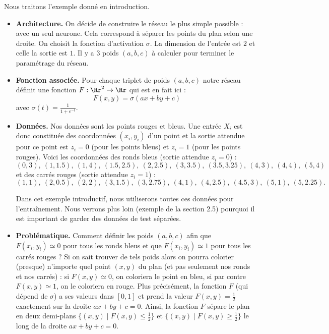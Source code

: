 \begin{exemple}{}{}
	Nous traitons l'exemple donné en introduction.
	\begin{itemize}
		\item \textbf{Architecture.} On décide de construire le réseau le plus simple possible : avec un seul neurone. Cela correspond à séparer les points du plan selon une droite.
		On choisit la fonction d'activation $\sigma$.
		La dimension de l'entrée est $2$ et celle la sortie est $1$.
		Il y a $3$ poids $(a,b,c)$ à calculer pour terminer le paramétrage du réseau.
		
		
		\item \textbf{Fonction associée.} Pour chaque triplet de poids $(a,b,c)$ notre réseau définit une fonction $F : \Rr^2 \to \Rr$
		qui est en fait ici :
		$$F(x,y) = \sigma(ax+by+c)$$
		avec $\sigma(t) = \frac{1}{1+e^{-t}}$.
		
		
		
		\item \textbf{Données.} Nos données sont les points rouges et bleus.
		Une entrée $X_i$ est donc constituée des coordonnées $(x_i,y_i)$ d'un point et la sortie attendue pour ce point est $z_i = 0$ (pour les points bleus) et $z_i = 1$ (pour les points rouges).
		Voici les coordonnées des ronds bleus (sortie attendue $z_i = 0$) :
		$$(0,3),\ (1,1.5),\ (1,4),\ (1.5,2.5),\ (2,2.5),\ (3,3.5),\ (3.5,3.25),\ (4,3),\ (4,4),\ (5,4)$$
		et des carrés rouges (sortie attendue $z_i = 1$) :
		$$(1,1),\ (2,0.5),\ (2,2),\ (3,1.5),\ (3,2.75),\ (4,1),\ (4,2.5),\ (4.5,3),\ (5,1),\ (5,2.25).$$  
		
		Dans cet exemple introductif, nous utiliserons toutes ces données pour l'entraînement. Nous verrons plus loin (exemple de la section 2.5) pourquoi il est important de garder des données de test séparées.
		
		\item \textbf{Problématique.} Comment définir les poids $(a,b,c)$ afin que $F(x_i,y_i) \simeq 0$ pour tous les ronds bleus et que $F(x_i,y_i)\simeq1$ pour tous les carrés rouges ? Si on sait trouver de tels poids alors on pourra colorier (presque) n'importe quel point $(x,y)$ du plan (et pas seulement nos ronds et nos carrés) : si $F(x,y) \simeq 0$, on coloriera le point en bleu, si par contre $F(x,y) \simeq 1$, on le coloriera en rouge.
		Plus précisément, la fonction $F$ (qui dépend de $\sigma$) a ses valeurs dans $[0,1]$ et prend la valeur $F(x,y)=\frac12$ exactement sur la droite $ax+by+c=0$. Ainsi, la fonction $F$ sépare le plan en deux demi-plans $\{ (x,y) \mid F(x,y)\le\frac12\}$ et $\{ (x,y) \mid F(x,y)\ge\frac12\}$ le long de la droite $ax+by+c=0$.
		

\end{itemize}
\end{exemple}
